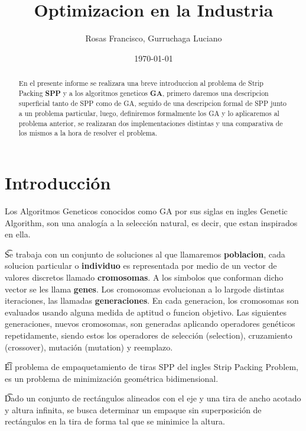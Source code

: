 \documentclass[10pt]{article}
\title{Optimizacion en la Industria} %
\author{Rosas Francisco, Gurruchaga Luciano}
\date{\today} %
\begin{document}
\maketitle

\begin{abstract}
En el presente informe se realizara una breve introduccion al problema de Strip Packing \textbf{SPP} y a los algoritmos geneticos \textbf{GA}, primero daremos una descripcion superficial tanto de SPP como de GA, seguido de una descripcion formal de SPP junto a un problema particular, luego, definiremos formalmente los GA y lo aplicaremos al problema anterior, se realizaran dos implementaciones distintas y una comparativa de los mismos a la hora de resolver el problema. 

\end{abstract}


\section{Introducción}


Los Algoritmos Geneticos conocidos como GA por sus siglas en ingles Genetic Algorithm, son una analogía a la selección natural, es decir, que estan inspirados en ella.

\t Se trabaja con un conjunto de soluciones al que llamaremos \textbf{poblacion}, cada solucion particular o \textbf{individuo} es representada por medio de un vector de valores discretos llamado \textbf{cromosomas}. A los simbolos que conforman dicho vector se les llama \textbf{genes}. Los cromosomas evolucionan a lo largode distintas iteraciones, las llamadas \textbf{generaciones}. En cada generacion, los cromosomas son evaluados usando alguna medida de aptitud o funcion objetivo. Las siguientes generaciones, nuevos cromosomas, son generadas aplicando operadores genéticos repetidamente, siendo estos los operadores de selección (selection), cruzamiento (crossover), mutación (mutation) y reemplazo.

\t El problema de empaquetamiento de tiras SPP del ingles Strip Packing Problem, es un problema de minimización geométrica bidimensional.

\t Dado un conjunto de rectángulos alineados con el eje y una tira de ancho acotado y altura infinita, se busca determinar un empaque sin superposición de rectángulos en la tira de forma tal que se minimice la altura.
\end{document}
